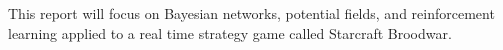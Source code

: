 This report will focus on Bayesian networks, potential fields, and reinforcement learning applied to a real time strategy game called Starcraft Broodwar. 
